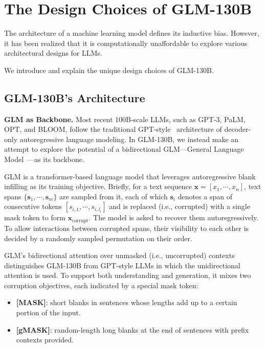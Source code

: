 \section{The Design Choices of GLM-130B}

The architecture of a machine learning model defines its inductive bias. However, it has been realized that it is computationally unaffordable to explore various architectural designs for LLMs.

We introduce and explain the unique design choices of GLM-130B. 

\subsection{GLM-130B's Architecture} \label{sec:glm-arch}

\textbf{GLM as  Backbone.} Most recent 100B-scale LLMs, such as GPT-3, PaLM, OPT, and BLOOM, follow the traditional GPT-style~\citep{radford2019language} architecture of decoder-only autoregressive language modeling. In GLM-130B, we instead make an attempt to explore the potential of a bidirectional GLM---General Language Model~\citep{du2022glm}---as its backbone.

GLM is a transformer-based language model that leverages autoregressive blank infilling as its training objective. Briefly, for a text sequence $\boldsymbol{x}=[x_1,\cdots,x_n]$, text spans $\{\boldsymbol{s}_1,\cdots,\boldsymbol{s}_m\}$ are sampled from it, each of which $\boldsymbol{s}_i$ denotes a span of consecutive tokens $[s_{i,1},\cdots,s_{i,l_i}]$ and is replaced (i.e., corrupted) with a single mask token to form $\boldsymbol{x}_{\text{corrupt}}$. 
The model is asked to recover them autoregressively. To allow interactions between corrupted spans, their visibility to each other is decided by a randomly sampled permutation on their order. 

GLM's bidirectional attention over unmasked (i.e., uncorrupted) contexts distinguishes GLM-130B from GPT-style LLMs in which the unidirectional attention is used. To support both understanding and generation, it mixes two corruption objectives, each indicated by a special mask token:

\begin{itemize}[leftmargin=*,itemsep=0pt,parsep=0.2em,topsep=0.0em,partopsep=0.0em]
    \item \textbf{[MASK]}: short blanks in sentences whose lengths add up to a certain portion of the input.
    \item \textbf{[gMASK]}: random-length long blanks at the end of sentences with prefix contexts provided.
\end{itemize}

